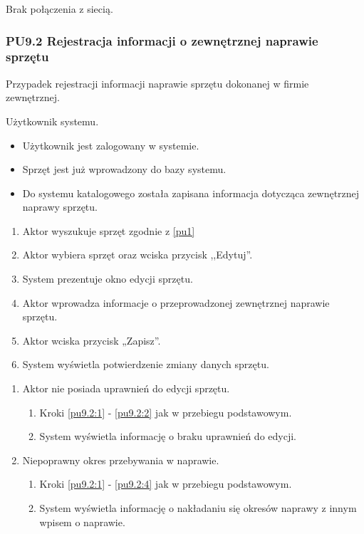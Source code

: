 Brak połączenia z siecią.

\subsubsection{PU9.2 Rejestracja informacji o zewnętrznej naprawie sprzętu}
Przypadek rejestracji informacji naprawie sprzętu dokonanej w firmie zewnętrznej.

Użytkownik systemu.

\begin{itemize}
\item Użytkownik jest zalogowany w systemie.
\item Sprzęt jest już wprowadzony do bazy systemu.
\end{itemize}

\begin{itemize}
\item Do systemu katalogowego została zapisana informacja dotycząca zewnętrznej naprawy sprzętu.
\end{itemize}

\begin{enumerate}
	\item \label{pu9.2:1} Aktor wyszukuje sprzęt zgodnie z \ref{pu1}
	\item \label{pu9.2:2} Aktor wybiera sprzęt oraz wciska przycisk ,,Edytuj''.
	\item System prezentuje okno edycji sprzętu.
	\item \label{pu9.2:4} Aktor wprowadza informacje o przeprowadzonej zewnętrznej naprawie sprzętu.
	\item Aktor wciska przycisk „Zapisz”.
	\item System wyświetla potwierdzenie zmiany danych sprzętu.
\end{enumerate}

\begin{enumerate}
	\item Aktor nie posiada uprawnień do edycji sprzętu.
	\begin{enumerate}[label*=\arabic*.]
		\item Kroki \ref{pu9.2:1} - \ref{pu9.2:2} jak w przebiegu podstawowym.
		\item System wyświetla informację o braku uprawnień do edycji.
	\end{enumerate}
	\item Niepoprawny okres przebywania w naprawie.
	\begin{enumerate}[label*=\arabic*.]
		\item Kroki \ref{pu9.2:1} - \ref{pu9.2:4} jak w przebiegu podstawowym.
		\item System wyświetla informację o nakładaniu się okresów naprawy z innym wpisem o naprawie.
	\end{enumerate}
\end{enumerate}

